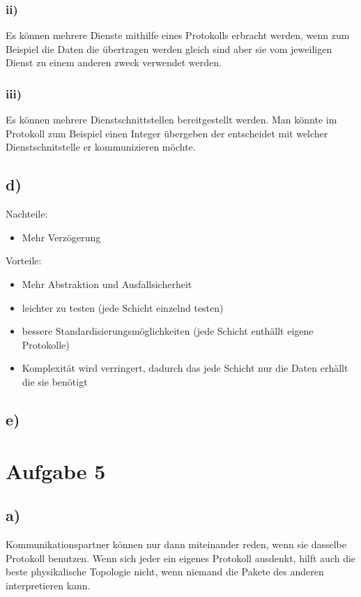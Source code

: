 \documentclass[a4paper,12pt]{scrartcl}
\begin{document}
\subsubsection{ii)}
Es können mehrere Dienste mithilfe eines Protokolls erbracht werden, wenn zum Beispiel die Daten die übertragen werden gleich sind
aber sie vom jeweiligen Dienst zu einem anderen zweck verwendet werden.

\subsubsection{iii)}
Es können mehrere Dienstschnittstellen bereitgestellt werden. Man könnte im Protokoll zum Beispiel einen Integer übergeben der entscheidet mit welcher Dienstschnitstelle er kommunizieren möchte.

\subsection{d)}
Nachteile:
\begin{itemize}
	\item Mehr Verzögerung
\end{itemize}
Vorteile:
\begin{itemize}
	\item Mehr Abstraktion und Ausfallsicherheit
	\item leichter zu testen (jede Schicht einzelnd testen)
	\item  bessere Standardisierungsmöglichkeiten (jede Schicht enthällt eigene Protokolle)
	\item Komplexität wird verringert, dadurch das jede Schicht nur die Daten erhällt die sie benötigt
\end{itemize}

\subsection{e)}

\section{Aufgabe 5}
\subsection{a)}
Kommunikationspartner können nur dann miteinander reden, wenn sie dasselbe
Protokoll benutzen. Wenn sich jeder ein eigenes Protokoll ausdenkt, hilft
auch die beste physikalische Topologie nicht, wenn niemand die Pakete des
anderen interpretieren kann.
\end{document}
